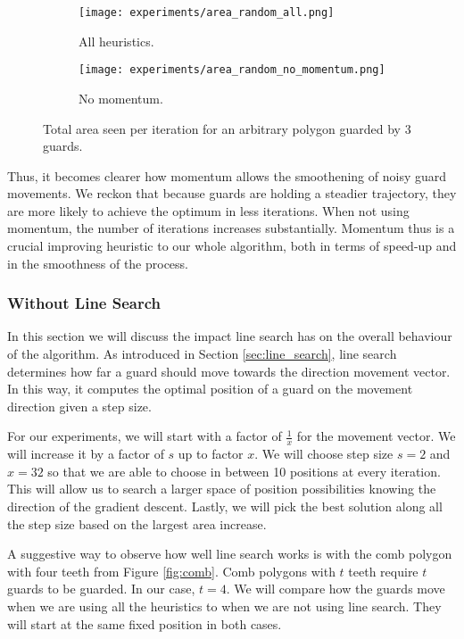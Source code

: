 \begin{figure}[h!]
    \centering
    \begin{subfigure}{0.45\textwidth}
        \texttt{[image: experiments/area\_random\_all.png]}
        \caption{All heuristics.}
        \label{fig:no_momentum1}
    \end{subfigure}
    \begin{subfigure}{0.45\textwidth}
        \texttt{[image: experiments/area\_random\_no\_momentum.png]}
        \caption{No momentum.}
        \label{fig:no_momentum2}
    \end{subfigure}
    \caption{Total area seen per iteration for an arbitrary polygon guarded by 3 guards.}
    \label{fig:no_momentum}
\end{figure}

Thus, it becomes clearer how momentum allows the smoothening of noisy guard movements. We reckon that because guards are holding a steadier trajectory, they are more likely to achieve the optimum in less iterations. When not using momentum, the number of iterations increases substantially. Momentum thus is a crucial improving heuristic to our whole algorithm, both in terms of speed-up and in the smoothness of the process.

\subsubsection{Without Line Search}
In this section we will discuss the impact line search has on the overall behaviour of the algorithm. As introduced in Section \ref{sec:line_search}, line search determines how far a guard should move towards the direction movement vector. In this way, it computes the optimal position of a guard on the movement direction given a step size.

For our experiments, we will start with a factor of $\frac 1 x$ for the movement vector. We will increase it by a factor of $s$ up to factor $x$. We will choose step size $s = 2$ and $x = 32$ so that we are able to choose in between 10 positions at every iteration. This will allow us to search a larger space of position possibilities knowing the direction of the gradient descent. Lastly, we will pick the best solution along all the step size based on the largest area increase. 

A suggestive way to observe how well line search works is with the comb polygon with four teeth from Figure \ref{fig:comb}. Comb polygons with $t$ teeth require $t$ guards to be guarded. In our case, $t = 4$. We will compare how the guards move when we are using all the heuristics to when we are not using line search. They will start at the same fixed position in both cases.

